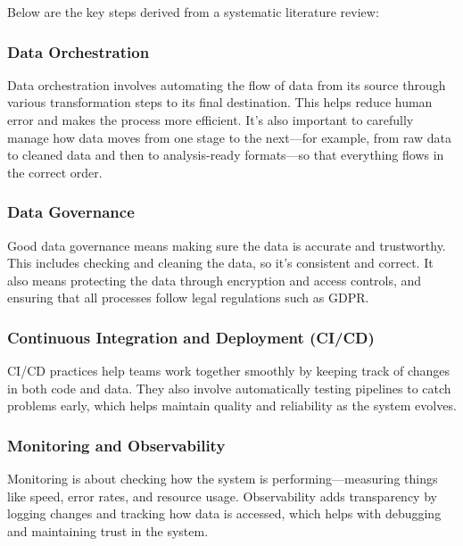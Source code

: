 Below are the key steps derived from a systematic literature review\cite{FANNOUCH2025100321}:

\subsubsection{Data Orchestration}
Data orchestration involves automating the flow of data from its source through various transformation steps to its final destination.
This helps reduce human error and makes the process more efficient.
It's also important to carefully manage how data moves from one stage to the next—for example,
from raw data to cleaned data and then to analysis-ready formats—so that everything flows in the correct order.

\subsubsection{Data Governance}
Good data governance means making sure the data is accurate and trustworthy.
This includes checking and cleaning the data, so it's consistent and correct.
It also means protecting the data through encryption and access controls,
and ensuring that all processes follow legal regulations such as GDPR.

\subsubsection{Continuous Integration and Deployment (CI/CD)}
CI/CD practices help teams work together smoothly by keeping track of changes in both code and data.
They also involve automatically testing pipelines to catch problems early,
which helps maintain quality and reliability as the system evolves.

\subsubsection{Monitoring and Observability}
Monitoring is about checking how the system is performing—measuring things like speed, error rates,
and resource usage.
Observability adds transparency by logging changes and tracking how data is accessed,
which helps with debugging and maintaining trust in the system.


